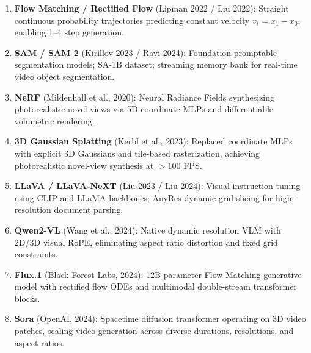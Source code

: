 \begin{enumerate}[leftmargin=*,itemsep=0.5pt,topsep=1pt]
\item \textbf{Flow Matching / Rectified Flow} (Lipman 2022 / Liu 2022): Straight continuous probability trajectories predicting constant velocity $v_t = x_1 - x_0$, enabling 1--4 step generation.
\item \textbf{SAM / SAM 2} (Kirillov 2023 / Ravi 2024): Foundation promptable segmentation models; SA-1B dataset; streaming memory bank for real-time video object segmentation.
\item \textbf{NeRF} (Mildenhall et al., 2020): Neural Radiance Fields synthesizing photorealistic novel views via 5D coordinate MLPs and differentiable volumetric rendering.
\item \textbf{3D Gaussian Splatting} (Kerbl et al., 2023): Replaced coordinate MLPs with explicit 3D Gaussians and tile-based rasterization, achieving photorealistic novel-view synthesis at $>100$ FPS.
\item \textbf{LLaVA / LLaVA-NeXT} (Liu 2023 / Liu 2024): Visual instruction tuning using CLIP and LLaMA backbones; AnyRes dynamic grid slicing for high-resolution document parsing.
\item \textbf{Qwen2-VL} (Wang et al., 2024): Native dynamic resolution VLM with 2D/3D visual RoPE, eliminating aspect ratio distortion and fixed grid constraints.
\item \textbf{Flux.1} (Black Forest Labs, 2024): 12B parameter Flow Matching generative model with rectified flow ODEs and multimodal double-stream transformer blocks.
\item \textbf{Sora} (OpenAI, 2024): Spacetime diffusion transformer operating on 3D video patches, scaling video generation across diverse durations, resolutions, and aspect ratios.
\end{enumerate}
